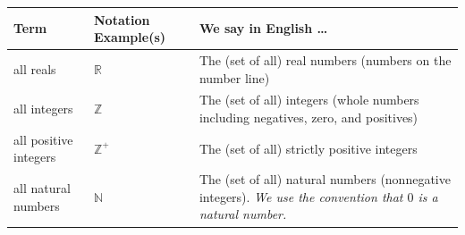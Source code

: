 
\begin{center}
\begin{tabular}{|llp{9.8cm}|}
\hline
{\bf Term} & {\bf Notation Example(s)} & {\bf We say in English \ldots } \\
\hline
all reals & $\mathbb{R}$ & The (set of all) real numbers (numbers on the number line)\\
all integers & $\mathbb{Z}$ & The (set of all) integers (whole numbers including negatives, zero, and positives) \\
all positive integers & $\mathbb{Z}^+$ & The (set of all) strictly positive integers \\
all natural numbers & $\mathbb{N}$ & The (set of all) natural numbers (nonnegative integers). {\it We use the convention that $0$ is a natural number.} \\

\end{tabular}
\end{center}
